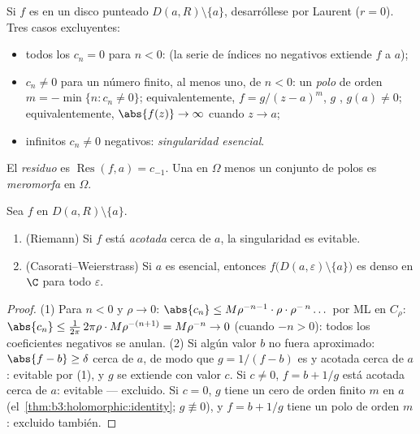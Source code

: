 \begin{definition}\label{def:b3:residues:singularities}
Si $f$ es  en un disco
punteado $D(a, R)\setminus
\{a\}$, desarróllese por Laurent ($r = 0$). Tres casos
excluyentes:
\begin{itemize}
  \item todos los $c_n = 0$ para $n < 0$:
  \emph{} (la
  serie de índices no negativos extiende $f$
   a $a$); \item
  $c_n \neq 0$ para un número finito, al menos uno, de $n < 0$: un
  \emph{polo} de orden $m = -\min\{n : c_n \neq 0\}$; equivalentemente,
  $f = g/(z-a)^m$, $g$ ,
  $g(a)
        \neq 0$; equivalentemente, $\abs{f(z)} \to \infty$ cuando $z\to
        a$; \item infinitos $c_n \neq 0$ negativos: \emph{singularidad
  esencial}.
\end{itemize}
El \emph{residuo} es $\operatorname{Res}(f, a) = c_{-1}$.
Una  en $\Omega$
menos un conjunto de polos es \emph{meromorfa}
en $\Omega$.
\end{definition}

\begin{theorem}
\label{thm:b3:residues:riemanncw}
Sea $f$  en
$D(a,R)\setminus\{a\}$.
\begin{enumerate}
  \item (Riemann) Si $f$ está \emph{acotada} cerca de $a$, la
  singularidad es evitable. \item
  (Casorati--Weierstrass) Si $a$ es esencial, entonces
  $f\bigl(D(a,\varepsilon)\setminus\{a\}\bigr)$ es denso en $\C$ para
  todo $\varepsilon$. 
\end{enumerate}
\end{theorem}

\begin{proof}
(1) Para $n < 0$ y $\rho \to 0$: $\abs{c_n} \leq
M\rho^{-n-1}\cdot\rho\cdot\rho^{-\,n}\dots$ por ML en $C_\rho$:
$\abs{c_n} \leq \frac{1}{2\pi}\,2\pi\rho\cdot
M\rho^{-(n+1)} = M\rho^{-n} \to 0$ (cuando $-n > 0$): todos los
coeficientes negativos se anulan. (2) Si algún valor $b$ no fuera
aproximado: $\abs{f - b} \geq
\delta$ cerca de $a$, de modo que $g = 1/(f - b)$ es
 y acotada cerca de $a$:
evitable por (1), y $g$ se extiende con valor $c$. Si $c \neq 0$,
$f = b + 1/g$ está acotada cerca de $a$: evitable --- excluido. Si
$c = 0$, $g$ tiene un cero de orden finito $m$ en $a$
(el~\cref{thm:b3:holomorphic:identity}; $g \not\equiv 0$), y
$f = b + 1/g$ tiene un polo de orden $m$: excluido también.
\end{proof}


